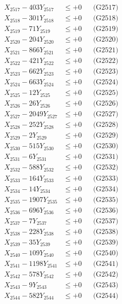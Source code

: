 \documentclass[a4paper,10pt]{article}
\begin{document}
{\begin{align}
X_{2517} - 403Y_{2517} &\leq +0 && \text{(G2517)} \\
X_{2518} - 301Y_{2518} &\leq +0 && \text{(G2518)} \\
X_{2519} - 71Y_{2519} &\leq +0 && \text{(G2519)} \\
X_{2520} - 204Y_{2520} &\leq +0 && \text{(G2520)} \\
\allowbreak
X_{2521} - 866Y_{2521} &\leq +0 && \text{(G2521)} \\
X_{2522} - 421Y_{2522} &\leq +0 && \text{(G2522)} \\
X_{2523} - 662Y_{2523} &\leq +0 && \text{(G2523)} \\
X_{2524} - 663Y_{2524} &\leq +0 && \text{(G2524)} \\
X_{2525} - 12Y_{2525} &\leq +0 && \text{(G2525)} \\
X_{2526} - 26Y_{2526} &\leq +0 && \text{(G2526)} \\
X_{2527} - 2049Y_{2527} &\leq +0 && \text{(G2527)} \\
X_{2528} - 252Y_{2528} &\leq +0 && \text{(G2528)} \\
X_{2529} - 2Y_{2529} &\leq +0 && \text{(G2529)} \\
X_{2530} - 515Y_{2530} &\leq +0 && \text{(G2530)} \\
\allowbreak
X_{2531} - 6Y_{2531} &\leq +0 && \text{(G2531)} \\
X_{2532} - 588Y_{2532} &\leq +0 && \text{(G2532)} \\
X_{2533} - 164Y_{2533} &\leq +0 && \text{(G2533)} \\
X_{2534} - 14Y_{2534} &\leq +0 && \text{(G2534)} \\
X_{2535} - 1907Y_{2535} &\leq +0 && \text{(G2535)} \\
X_{2536} - 696Y_{2536} &\leq +0 && \text{(G2536)} \\
X_{2537} - 7Y_{2537} &\leq +0 && \text{(G2537)} \\
X_{2538} - 228Y_{2538} &\leq +0 && \text{(G2538)} \\
X_{2539} - 35Y_{2539} &\leq +0 && \text{(G2539)} \\
X_{2540} - 109Y_{2540} &\leq +0 && \text{(G2540)} \\
\allowbreak
X_{2541} - 1198Y_{2541} &\leq +0 && \text{(G2541)} \\
X_{2542} - 578Y_{2542} &\leq +0 && \text{(G2542)} \\
X_{2543} - 9Y_{2543} &\leq +0 && \text{(G2543)} \\
X_{2544} - 582Y_{2544} &\leq +0 && \text{(G2544)} \\

\end{align}}
\end{document}
